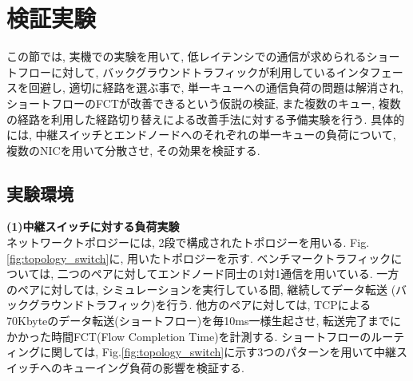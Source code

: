 \section{検証実験}
\label{sec:verification}
この節では, 実機での実験を用いて, 低レイテンシでの通信が求められるショートフローに対して,
バックグラウンドトラフィックが利用しているインタフェースを回避し, 適切に経路を選ぶ事で, 単一キューへの通信負荷の問題は解消され,
ショートフローのFCTが改善できるという仮説の検証, また複数のキュー,
複数の経路を利用した経路切り替えによる改善手法に対する予備実験を行う.
具体的には, 中継スイッチとエンドノードへのそれぞれの単一キューの負荷について, 複数のNICを用いて分散させ, その効果を検証する.

\subsection{実験環境}
{\bf (1)中継スイッチに対する負荷実験}\\
ネットワークトポロジーには, 2段で構成されたトポロジーを用いる.
Fig.\ref{fig:topology_switch}に, 用いたトポロジーを示す.
ベンチマークトラフィックについては, 二つのペアに対してエンドノード同士の1対1通信を用いている.
一方のペアに対しては, シミュレーションを実行している間, 継続してデータ転送 (バックグラウンドトラフィック)を行う.
他方のペアに対しては, TCPによる70Kbyteのデータ転送(ショートフロー)を毎10ms一様生起させ,
転送完了までにかかった時間FCT(Flow Completion Time)を計測する.
ショートフローのルーティングに関しては,
Fig.\ref{fig:topology_switch}に示す3つのパターンを用いて中継スイッチへのキューイング負荷の影響を検証する.


